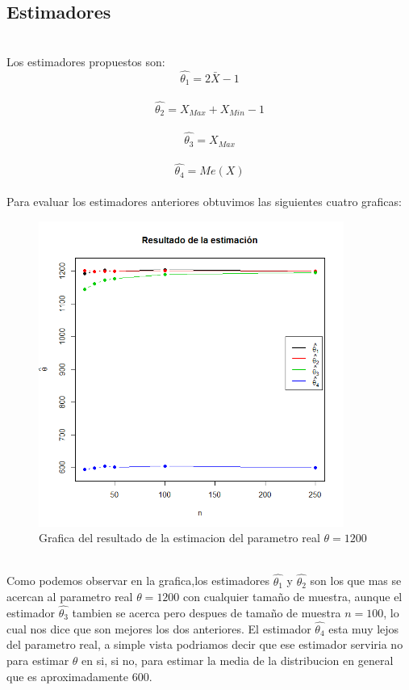 \documentclass[letterpaper,12pt,onecolumn,titlepage]{article}
\begin{document}
\subsection{Estimadores}
~\\ Los estimadores propuestos son:
~\ $$\hat{\theta_1}=2\bar{X}-1$$
~\ $$\hat{\theta_2}=X_{Max}+X_{Min}-1$$
~\ $$\hat{\theta_3}=X_{Max}$$
~\ $$\hat{\theta_4}=Me(X) $$
~\\ Para evaluar los estimadores anteriores obtuvimos las siguientes cuatro graficas:
\begin{figure}[!h]
    \begin{center}
        \includegraphics[width=10cm]{Figuras/A.png}
        \caption{Grafica del resultado de la estimacion del parametro real $\theta=1200$}
        \label{fig:Densidad}
    \end{center}
\end{figure}
~\\ Como podemos observar en la grafica,los estimadores $\hat{\theta_1}$ y $\hat{\theta_2}$ son los que mas se acercan al parametro real $\theta=1200$  con cualquier tama\~{n}o de muestra, aunque el estimador $\hat{\theta_3}$ tambien se acerca pero despues de tama\~{n}o de muestra $n=100$, lo cual nos dice que son mejores los dos anteriores. El estimador $\hat{\theta_4}$ esta muy lejos del parametro real, a simple vista podriamos decir que ese estimador serviria no para estimar $\theta$ en si, si no, para estimar la media de la distribucion en general que es aproximadamente 600.
\end{document}
